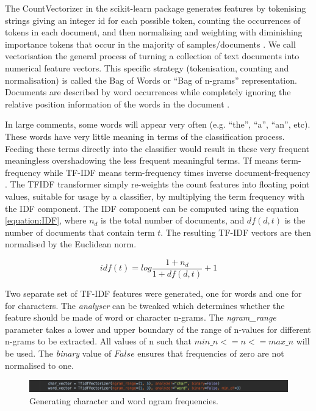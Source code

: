 The CountVectorizer in the scikit-learn package generates features by tokenising strings giving an integer id for each possible token, counting the occurrences of tokens in each document, and then normalising and weighting with diminishing importance tokens that occur in the majority of samples/documents \cite{scikit:tfidf}. We call vectorisation the general process of turning a collection of text documents into numerical feature vectors. This specific strategy (tokenisation, counting and normalisation) is called the Bag of Words or ``Bag of n-grams'' representation. Documents are described by word occurrences while completely ignoring the relative position information of the words in the document \cite{scikit:tfidf}.

In large comments, some words will appear very often (e.g. ``the'', ``a'', ``an'', etc). These words have very little meaning in terms of the classification process. Feeding these terms directly into the classifier would result in these very frequent meaningless overshadowing the less frequent meaningful terms. Tf means term-frequency while TF-IDF means term-frequency times inverse document-frequency \cite{scikit:tfidf}. The TFIDF transformer simply re-weights the count features into floating point values, suitable for usage by a classifier, by multiplying the term frequency with the IDF component. The IDF component can be computed using the equation \ref{equation:IDF}, where $n_{d}$ is the total number of documents, and $df(d,t)$ is the number of documents that contain term $t$. The resulting TF-IDF vectors are then normalised by the Euclidean norm.

\begin{equation}
	idf(t) = log\frac{1 + n_{d}}{1 + df(d, t)} + 1
	\label{equation:IDF}
\end{equation}

Two separate set of TF-IDF features were generated, one for words and one for for characters. The \textit{analyser} can be tweaked which determines whether the feature should be made of word or character n-grams. The \textit{ngram\_range} parameter takes a lower and upper boundary of the range of n-values for different n-grams to be extracted. All values of n such that $min\_n <= n <= max\_n$ will be used. The \textit{binary} value of $False$ ensures that frequencies of zero are not normalised to one.

\begin{figure}[H]
	\centering
	\includegraphics[width=\textwidth]{Images/Implementation/DataProcessing/AbuseDetection/TFIDF}
	\caption{Generating character and word ngram frequencies.}
	\label{fig:AbuseDetection-TFIDF}
\end{figure}

